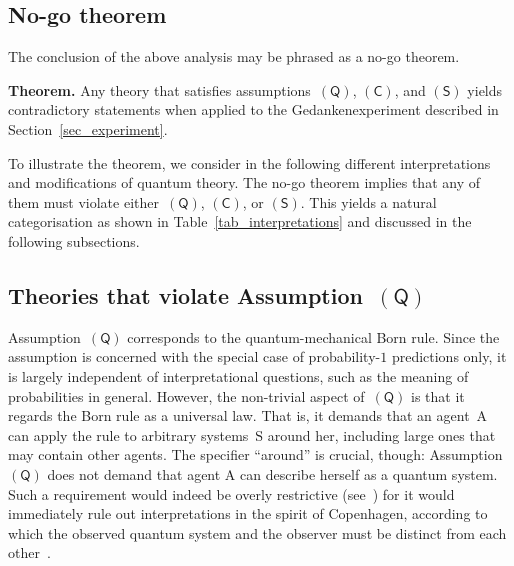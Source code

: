 \documentclass[12pt]{article}
\theoremstyle{mystyle}
\theoremstyle{definition}
\newcommand*{\Agent}{\mathrm{A}}
\newcommand*{\System}{\mathrm{S}}
\newcommand*{\QT}{\mathsf{(Q)}}
\newcommand*{\SW}{\mathsf{(S)}}
\newcommand*{\SelfCons}{\mathsf{(C)}}
\begin{document}
\pagebreak[3]
 
\subsection{No-go theorem} \label{sec_nogo}

The conclusion of the above analysis may be phrased as a no-go theorem. 

\begin{emphbox}
  \noindent \textbf{Theorem.} 
 \noindent Any theory that satisfies assumptions~$\QT$, $\SelfCons$, and $\SW$ yields contradictory statements when applied to the Gedankenexperiment described in Section~\ref{sec_experiment}.
\end{emphbox}

To illustrate the theorem, we consider in the following different interpretations and modifications of quantum theory. The no-go theorem implies that any of them must violate either~$\QT$, $\SelfCons$, or $\SW$. This yields a natural categorisation as shown in Table~\ref{tab_interpretations} and discussed in the following subsections.  


\subsection{Theories that violate Assumption~$\QT$} \label{sec_QTviolation}

Assumption~$\QT$ corresponds to the quantum-mechanical Born rule. Since the assumption is concerned with the special case of probability-$1$ predictions only, it is largely independent of interpretational questions, such as the meaning of probabilities in general. However, the non-trivial aspect of~$\QT$ is that it regards the Born rule as a universal law. That is, it demands that an agent~$\Agent$ can apply the rule to arbitrary systems~$\System$ around her, including large ones that may contain other agents. The specifier ``around'' is crucial, though: Assumption~$\QT$ does not demand that agent $\Agent$ can describe herself as a quantum system. Such a requirement  would indeed be overly restrictive (see~\cite{DallaChiara77}) for it would immediately rule out  interpretations in the spirit of Copenhagen, according to which the observed quantum system and the observer must be distinct from each other~\cite{Heisenberg35,Bohr49}. 
\end{document}

